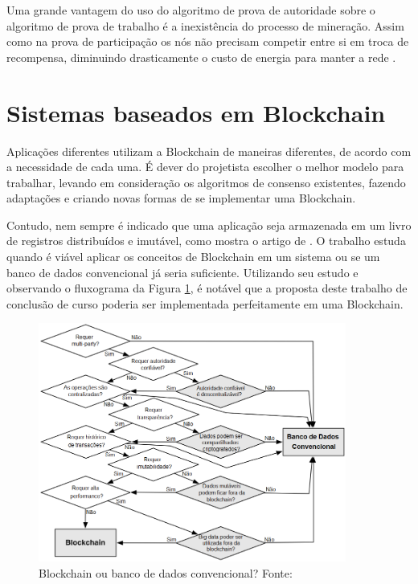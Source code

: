 \documentclass[openright]{normas-utf-tex} %
\begin{document}
Uma grande vantagem do uso do algoritmo de prova de autoridade sobre o algoritmo de prova de trabalho é a inexistência do processo de mineração. Assim como na prova de participação os nós não precisam competir entre si em troca de recompensa, diminuindo drasticamente o custo de energia para manter a rede \cite{Naumoff2017}.




\section{Sistemas baseados em Blockchain}

Aplicações diferentes utilizam a Blockchain de maneiras diferentes, de acordo com a necessidade de cada uma. É dever do projetista escolher o melhor modelo para trabalhar, levando em consideração os algoritmos de consenso existentes, fazendo adaptações e criando novas formas de se implementar uma Blockchain.

Contudo, nem sempre é indicado que uma aplicação seja armazenada em um livro de registros distribuídos e imutável, como mostra o artigo de . O trabalho estuda quando é viável aplicar os conceitos de Blockchain em um sistema ou se um banco de dados convencional já seria suficiente. Utilizando seu estudo e observando o fluxograma da Figura \ref{fig:suitability}, é notável que a proposta deste trabalho de conclusão de curso poderia ser implementada perfeitamente em uma Blockchain.

\begin{figure}[ht]
\centering
\includegraphics[width=0.9\textwidth]{suitability.PNG}
\caption{Blockchain ou banco de dados convencional? Fonte: }
\label{fig:suitability}
\end{figure}
\end{document}
